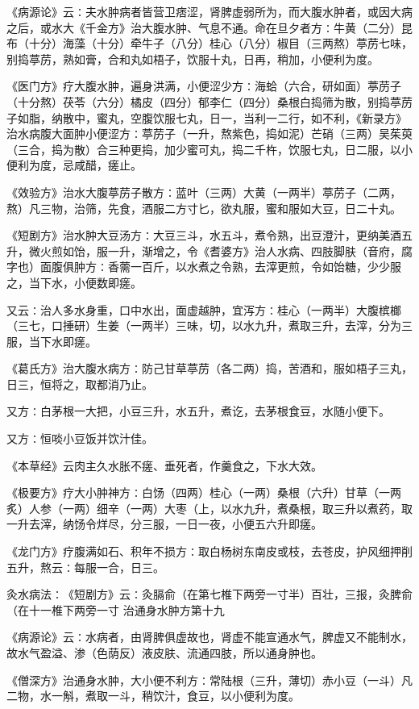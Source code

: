 \documentclass[a4paper,12pt,UTF8,twoside]{ctexbook}
\begin{document}
《病源论》云∶夫水肿病者皆营卫痞涩，肾脾虚弱所为，而大腹水肿者，或因大病之后，或水大《千金方》治大腹水肿、气息不通。命在旦夕者方∶牛黄（二分）昆布（十分）海藻（十分）牵牛子（八分）桂心（八分）椒目（三两熬）葶苈七味，别捣葶苈，熟如膏，合和丸如梧子，饮服十丸，日再，稍加，小便利为度。

《医门方》疗大腹水肿，遍身洪满，小便涩少方∶海蛤（六合，研如面）葶苈子（十分熬）茯苓（六分）橘皮（四分）郁李仁（四分）桑根白捣筛为散，别捣葶苈子如脂，纳散中，蜜丸，空腹饮服七丸，日一，当利一二行，如不利，《新录方》治水病腹大面肿小便涩方∶葶苈子（一升，熬紫色，捣如泥）芒硝（三两）吴茱萸（三合，捣为散）合三种更捣，加少蜜可丸，捣二千杵，饮服七丸，日二服，以小便利为度，忌咸醋，瘥止。

《效验方》治水大腹葶苈子散方∶蓝叶（三两）大黄（一两半）葶苈子（二两，熬）凡三物，治筛，先食，酒服二方寸匕，欲丸服，蜜和服如大豆，日二十丸。

《短剧方》治水肿大豆汤方∶大豆三斗，水五斗，煮令熟，出豆澄汁，更纳美酒五升，微火煎如饴，服一升，渐增之，令《耆婆方》治人水病、四肢脚肤（音府，腐字也）面腹俱肿方∶香薷一百斤，以水煮之令熟，去滓更煎，令如饴糖，少少服之，当下水，小便数即瘥。

又云∶治人多水身重，口中水出，面虚越肿，宜泻方∶桂心（一两半）大腹槟榔（三七，口捶研）生姜（一两半）三味，切，以水九升，煮取三升，去滓，分为三服，当下水即瘥。

《葛氏方》治大腹水病方∶防己甘草葶苈（各二两）捣，苦酒和，服如梧子三丸，日三，恒将之，取都消乃止。

又方∶白茅根一大把，小豆三升，水五升，煮讫，去茅根食豆，水随小便下。

又方∶恒啖小豆饭并饮汁佳。

《本草经》云肉主久水胀不瘥、垂死者，作羹食之，下水大效。

《极要方》疗大小肿神方∶白饧（四两）桂心（一两）桑根（六升）甘草（一两炙）人参（一两）细辛（一两）大枣（上，以水九升，煮桑根，取三升以煮药，取一升去滓，纳饧令烊尽，分三服，一日一夜，小便五六升即瘥。

《龙门方》疗腹满如石、积年不损方∶取白杨树东南皮或枝，去苍皮，护风细押削五升，熬云∶每服一合，日三。

灸水病法∶《短剧方》云∶灸膈俞（在第七椎下两旁一寸半）百壮，三报，灸脾俞（在十一椎下两旁一寸
治通身水肿方第十九

《病源论》云∶水病者，由肾脾俱虚故也，肾虚不能宣通水气，脾虚又不能制水，故水气盈溢、渗（色荫反）液皮肤、流通四肢，所以通身肿也。

《僧深方》治通身水肿，大小便不利方∶常陆根（三升，薄切）赤小豆（一斗）凡二物，水一斛，煮取一斗，稍饮汁，食豆，以小便利为度。
\end{document}
